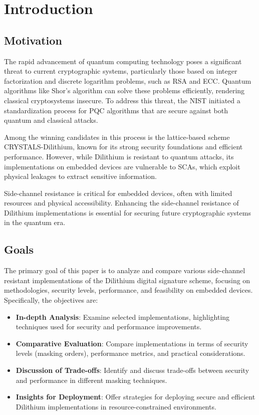 
\chapter{Introduction}
\thispagestyle{chapterstart}

\section{Motivation}

The rapid advancement of quantum computing technology poses a significant threat to current cryptographic systems, particularly those based on integer factorization and discrete logarithm problems, such as RSA and \ac{ECC}. Quantum algorithms like Shor's algorithm can solve these problems efficiently, rendering classical cryptosystems insecure. To address this threat, the \ac{NIST} initiated a standardization process for \ac{PQC} algorithms that are secure against both quantum and classical attacks.

Among the winning candidates in this process is the lattice-based scheme CRYSTALS-Dilithium, known for its strong security foundations and efficient performance. However, while Dilithium is resistant to quantum attacks, its implementations on embedded devices are vulnerable to \acp{SCA}, which exploit physical leakages to extract sensitive information.

Side-channel resistance is critical for embedded devices, often with limited resources and physical accessibility. Enhancing the side-channel resistance of Dilithium implementations is essential for securing future cryptographic systems in the quantum era.

\section{Goals}

The primary goal of this paper is to analyze and compare various side-channel resistant implementations of the Dilithium digital signature scheme, focusing on methodologies, security levels, performance, and feasibility on embedded devices. Specifically, the objectives are:

\begin{itemize}
    \item \textbf{In-depth Analysis}: Examine selected implementations, highlighting techniques used for security and performance improvements.
    \item \textbf{Comparative Evaluation}: Compare implementations in terms of security levels (masking orders), performance metrics, and practical considerations.
    \item \textbf{Discussion of Trade-offs}: Identify and discuss trade-offs between security and performance in different masking techniques.
    \item \textbf{Insights for Deployment}: Offer strategies for deploying secure and efficient Dilithium implementations in resource-constrained environments.
\end{itemize}

